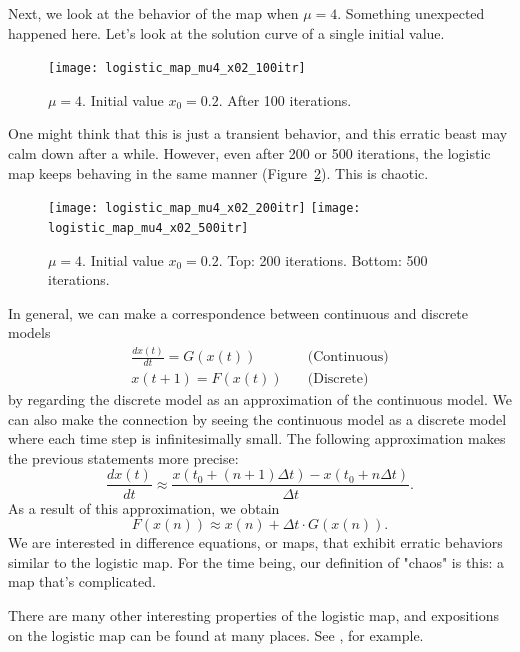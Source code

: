 \documentclass[12pt,twoside,draft]{book}
\begin{document}
Next, we look at the behavior of the map when $\mu = 4$.
Something unexpected happened here.
Let's look at the solution curve of a single initial value.
\begin{figure}[ht]
  \begin{center}
    \texttt{[image: logistic\_map\_mu4\_x02\_100itr]}
  \end{center}
  \caption{
    $\mu = 4$. Initial value $x_0 = 0.2$. After 100 iterations.
  }
  \label{fig:chaotic_map1}
\end{figure}
One might think that this is just a transient behavior, and this erratic beast may calm down after a while.
However, even after 200 or 500 iterations, the logistic map keeps behaving in the same manner (Figure~\ref{fig:chaotic_map2}).
This is chaotic.
\begin{figure}[p]
  \begin{center}
    \texttt{[image: logistic\_map\_mu4\_x02\_200itr]}
    \texttt{[image: logistic\_map\_mu4\_x02\_500itr]}
  \end{center}
  \caption{
    $\mu = 4$. Initial value $x_0 = 0.2$.
    Top: 200 iterations. Bottom: 500 iterations.
  }
  \label{fig:chaotic_map2}
\end{figure}

In general, we can make a correspondence between continuous and discrete models
\begin{equation}
 \begin{aligned}
  \frac{dx(t)}{dt} = G(x(t)) &\quad\mbox{(Continuous)} \\
  x(t + 1) = F(x(t)) &\quad\mbox{(Discrete)}
\end{aligned}
  \label{eqn:intro2}
\end{equation}
by regarding the discrete model as an approximation of the continuous model.
We can also make the connection by seeing the continuous model as a discrete model where each time step is infinitesimally small.
The following approximation makes the previous statements more precise:
\begin{equation*}
  \frac{dx(t)}{dt} \approx \frac{x(t_0 + (n+1)\Delta t) - x(t_0 + n \Delta t)}{\Delta t}.
\end{equation*}
As a result of this approximation, we obtain
\begin{equation*}
  F(x(n)) \approx x(n) + \Delta t \cdot G(x(n)).
\end{equation*}
We are interested in difference equations, or maps, that exhibit erratic behaviors similar to the logistic map.
For the time being, our definition of "chaos" is this: a map that's complicated.
\begin{remark}
  There are many other interesting properties of the logistic map, and expositions on the logistic map can be found at many places.
  See \citep{may1, may2, devaney}, for example.
\end{remark}
\end{document}
